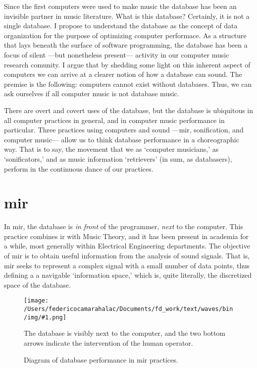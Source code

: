 \documentclass[
]{book}
\date{}
\newcommand{\img}[4]{
\begin{figure}[!htbp]
\centering
\texttt{[image: /Users/federicocamarahalac/Documents/fd\_work/text/waves/bin/img/\#1.png]}
\caption{#4}
\label{img:#1}
#3
\end{figure}
\FloatBarrier
}
\begin{document}
Since the first computers were used to make music the database has been an invisible partner in music literature. What is this database? Certainly, it is not a single database. I propose to understand the database as the concept of data organization for the purpose of optimizing computer performace. As a structure that lays beneath the surface of software programming, the database has been a focus of silent ---but nonetheless present--- activity in our computer music research comunity. I argue that by shedding some light on this inherent aspect of computers we can arrive at a clearer notion of how a database can sound. The premise is the following: computers cannot exist without databases. Thus, we can ask ourselves if all computer music is not database music.


There are overt and covert uses of the database, but the database is ubiquitous in all computer practices in general, and in computer music performance in particular. Three practices using computers and sound ---\gls{mir}, sonification, and computer music--- allow us to think database performance in a choreographic way. That is to say, the movement that we as `computer musicians,' as `sonificators,' and as music information `retrievers' (in sum, as databasers), perform in the continuous dance of our practices.


\section{mir}

In \gls{mir}, the database is \textit{in front} of the programmer, \textit{next} to the computer. This practice combines \gls{ir} with Music Theory, and it has been present in academia for a while, most generally within Electrical Engineering departments. The objective of \gls{mir} is to obtain useful information from the analysis of sound signals. That is, \gls{mir} seeks to represent a complex signal with a small number of data points, thus defining a a navigable `information space,' which is, quite literally, the discretized space of the database.

\img{mir}{0.3}{
	The database is visibly next to the computer, and the two bottom arrows indicate the intervention of the human operator.
}{Diagram of database performance in \gls{mir} practices.}
\end{document}

